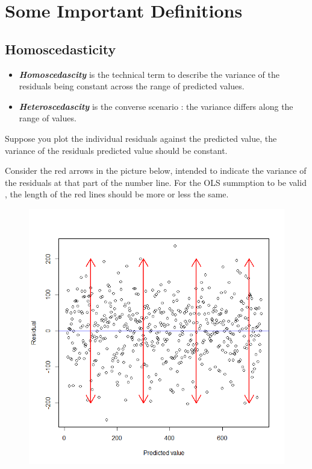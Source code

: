 \documentclass[residuals.tex]{subfiles}
\begin{document}
\newpage
\Large
\section{Some Important Definitions}
\subsection{Homoscedasticity}
\begin{itemize}
\item \textbf{\textit{Homoscedascity}} is the technical term to describe the variance of the residuals being constant across the range of predicted values. 

\item \textbf{\textit{Heteroscedascity}} is the converse scenario : the variance differs along the range of values.
\end{itemize}


\noindent Suppose you plot the individual residuals against the predicted value, the variance of the residuals predicted value should be constant. 

\noindent Consider the red arrows in the picture below, intended to indicate the variance of the residuals at that part of the number line. For the OLS summption to be valid , the length of the red lines should be more or less the same.

\begin{figure}[h!]
\centering
\includegraphics[width=0.6\linewidth]{homosked}
\caption{}
\label{fig:homosked}
\end{figure}
\end{document}
